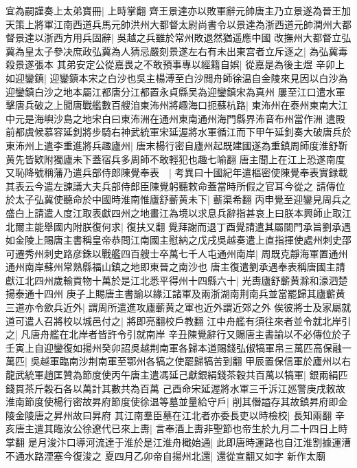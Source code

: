 宜為嗣謹奏上太弟寶冊|{
	上時掌翻}
齊王景達亦以敗軍辭元帥唐主乃立景遂為晉王加天策上將軍江南西道兵馬元帥洪州大都督太尉尚書令以景達為浙西道元帥潤州大都督景達以浙西方用兵固辭|{
	吳越之兵雖於常州敗退然猶遥應中國}
改撫州大都督立弘冀為皇太子參决庶政弘冀為人猜忌嚴刻景遂左右有未出東宫者立斥逐之|{
	為弘冀毒殺景遂張本}
其弟安定公從嘉畏之不敢預事專以經籍自娯|{
	從嘉是為後主煜}
辛卯上如迎鑾鎮|{
	迎鑾鎮本宋之白沙也吳主楊溥至白沙閲舟師徐温自金陵來見因以白沙為迎鑾鎮白沙之地本屬江都唐分江都置永貞縣吴為迎鑾鎮宋為真州}
屢至江口遣水軍擊唐兵破之上聞唐戰艦數百艘洎東㳍州將趣海口扼蘇杭路|{
	東㳍州在泰州東南大江中元是海嶼沙島之地宋白曰東㳍洲在通州東南通州海門縣界㳍音布州當作洲}
遣殿前都虞候慕容延釗將步騎右神武統軍宋延渥將水軍循江而下甲午延釗奏大破唐兵於東㳍州上遣李重進將兵趣廬州|{
	唐末楊行密自廬州起既建國遂為重鎮周師度淮舒靳黄先皆欵附獨廬未下蓋宿兵多周師不敢輕犯也趣七喻翻}
唐主聞上在江上恐遂南度又恥降號稱藩乃遣兵部侍郎陳覺奉表　|{
	考異曰十國紀年遣樞密使陳覺奉表實録載其表云今遣左諫議大夫兵部侍郎臣陳覺躬聽敕命蓋當時所假之官耳今從之}
請傳位於太子弘冀使聽命於中國時淮南惟廬舒蘄黄未下|{
	蘄渠希翻}
丙申覺至迎鑾見周兵之盛白上請遣人度江取表獻四州之地畫江為境以求息兵辭指甚哀上曰朕本興師止取江北爾主能舉國内附朕復何求|{
	復扶又翻}
覺拜謝而退丁酉覺請遣其屬閤門承旨劉承遇如金陵上賜唐主書稱皇帝恭問江南國主慰納之戊戌吳越奏遣上直指揮使處州刺史邵可遷秀州刺史路彦銖以戰艦四百艘士卒萬七千人屯通州南岸|{
	周既克靜海軍置通州通州南岸蘇州常熟縣福山鎮之地即東晉之南沙也}
唐主復遣劉承遇奉表稱唐國主請獻江北四州歲輸貢物十萬於是江北悉平得州十四縣六十|{
	光夀廬舒蘄黄滁和濠泗楚揚泰通十四州}
庚子上賜唐主書諭以緣江諸軍及兩浙湖南荆南兵並當罷歸其廬蘄黄三道亦令歛兵近外|{
	謂周所遣進攻廬蘄黄之軍也近外謂近郊之外}
俟彼將士及家屬就道可遣人召將校以城邑付之|{
	將即亮翻校戶教翻}
江中舟艦有須往來者並令就北岸引之|{
	凡唐舟艦在北岸者皆許令引就南岸}
辛丑陳覺辭行又賜唐主書諭以不必傳位於子壬寅上自迎鑾復如揚州癸卯詔吳越荆南軍各歸本道賜錢弘俶犒軍帛三萬匹高保融一萬匹|{
	吳越軍臨南沙荆南軍至鄂州各犒之使罷歸犒苦到翻}
甲辰置保信軍於廬州以右龍武統軍趙匡贊為節度使丙午唐主遣馮延己獻銀絹錢茶穀共百萬以犒軍|{
	銀兩絹匹錢貫茶斤穀石各以萬計其數共為百萬}
己酉命宋延渥將水軍三千泝江廵警庚戌敇故淮南節度使楊行密故昇府節度使徐温等墓並量給守戶|{
	削其僭謚存其故鎮昇府即金陵金陵唐之昇州故曰昇府}
其江南羣臣墓在江北者亦委長吏以時檢校|{
	長知兩翻}
辛亥唐主遣其臨汝公徐遼代已來上夀|{
	言奉酒上夀非聖節也帝生於九月二十四日上時掌翻}
是月浚汴口導河流達于淮於是江淮舟檝始通|{
	此即唐時運路也自江淮割據運漕不通水路湮塞今復浚之}
夏四月乙卯帝自揚州北還|{
	還從宣翻又如字}
新作太廟

